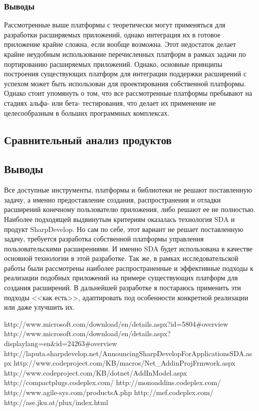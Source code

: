 \subsubsection{Выводы}

Рассмотренные выше платформы с теоретически могут применяться для разработки расширяемых приложений, однако интеграция их в готовое приложение крайне сложна, если вообще возможна. Этот недостаток делает крайне неудобным использование перечисленных платформ в рамках задачи по портированию расширяемых приложений. Однако, основные принципы построения существующих платформ для интеграции поддержки расширений с успехом может быть использован для проектирования собственной платформы. Однако стоит упомянуть о том, что все рассмотренные платформы пребывают на стадиях альфа- или бета- тестирования, что делает их применение не целесообразным в больших программных комплексах.

\subsection{Сравнительный анализ продуктов}




\subsection{Выводы}

Все доступные инструменты, платформы и библиотеки не решают поставленную задачу, а именно предоставление создания, распространения и отладки расширений конечному пользователю приложения, либо решают ее не полностью. Наиболее подходящей выдвинутым критериям оказалась технология SDA и продукт SharpDevelop.  Но сам по себе, этот вариант не решает поставленную задачу, требуется разработка собственной платформы управления пользовательскими расширениями. И именно SDA будет использована в качестве основной технологии в этой разработке. Так же, в рамках исследовательской работы были рассмотрены наиболее распространенные и эффективные подходы к реализации подобных приложений на примере существующих платформ для создания расширений. В дальнейшей разработке я постараюсь применить эти подходы <<как есть>>, адаптировать под особенности конкретной реализации или даже улучшить их.

http://www.microsoft.com/download/en/details.aspx?id=5804\#overview
http://www.microsoft.com/download/en/details.aspx?displaylang=en\&id=24263\#overview
http://laputa.sharpdevelop.net/AnnouncingSharpDevelopForApplicationsSDA.aspx
http://www.codeproject.com/KB/macros/Net\_AddinProjFrmwork.aspx
http://www.codeproject.com/KB/dotnet/AddInModel.aspx
http://compactplugs.codeplex.com/
http://monoaddins.codeplex.com/
http://www.agile-sys.com/productsA.php
http://mef.codeplex.com/
http://ase.jku.at/plux/index.html

\pagebreak